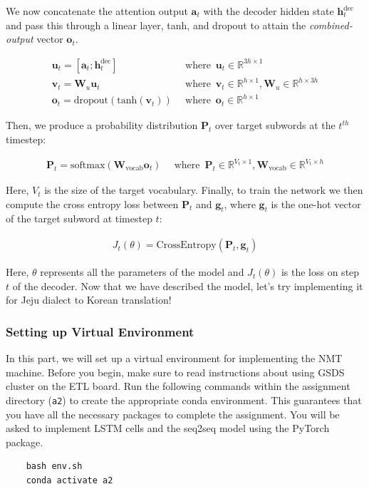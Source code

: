\documentclass{assignment format}
\newcommand{\Real}{\mathbb{R}}
\newcommand{\hdec}{\mathbf{h}^{\text{dec}}}
\begin{document}
We now concatenate the attention output $\mathbf{a}_t$ with the decoder hidden state $\hdec_t$ and pass this through a linear layer, tanh, and dropout to attain the \textit{combined-output} vector $\mathbf{o}_{t}$.

\begin{align}   
    \mathbf{u}_{t} = [\mathbf{a}_{t}; \hdec_t] \enspace &\text{where} \enspace \mathbf{u}_t \in  \Real^{3h \times 1} \\
    \mathbf{v}_t = \mathbf{W}_{u}\mathbf{u}_t \enspace &\text{where} \enspace \mathbf{v}_t \in \Real^{h \times 1}, \mathbf{W}_{u} \in \Real^{h \times 3h}\\
    \mathbf{o}_t = \text{dropout}(\text{tanh}(\mathbf{v}_t)) \enspace &\text{where} \enspace \mathbf{o}_t \in \Real^{h \times 1}
\end{align}

Then, we produce a probability distribution $\mathbf{P}_t$ over target subwords at the $t^{th}$ timestep:

\begin{align}
    \mathbf{P}_t = \text{softmax}(\mathbf{W}_{\text{vocab}}\mathbf{o}_{t}) \enspace &\text{where} \enspace \mathbf{P}_t \in \Real^{V_{t} \times 1}, \mathbf{W}_{\text{vocab}} \in \Real^{V_{t} \times h}
\end{align}

Here, $V_{t}$ is the size of the target vocabulary. Finally, to train the network we then compute the cross entropy loss between $\mathbf{P}_t$ and $\mathbf{g}_{t}$, where $\mathbf{g}_{t}$ is the one-hot vector of the target subword at timestep $t$:

\begin{align}
    J_t(\theta) = \mathrm{CrossEntropy}(\mathbf{P}_t,\mathbf{g}_{t})
\end{align}

Here, $\theta$ represents all the parameters of the model and $J_t(\theta)$ is the loss on step $t$ of the decoder.
Now that we have described the model, let's try implementing it for Jeju dialect to Korean translation!

\subsubsection{Setting up Virtual Environment}
In this part, we will set up a virtual environment for implementing the NMT machine. Before you begin, make sure to read instructions about using GSDS cluster on the ETL board. Run the following commands within the assignment directory (\texttt{a2}) to create the appropriate conda environment. This guarantees that you have all the necessary packages to complete the assignment. You will be asked to implement LSTM cells and the seq2seq model using the PyTorch package. 
\begin{verbatim}
    bash env.sh
    conda activate a2
\end{verbatim}
\end{document}
